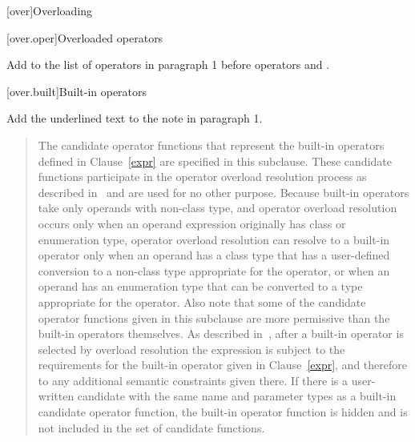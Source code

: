 
\setcounter{chapter}{12}
[over]{Overloading}

\setcounter{section}{3}
\setcounter{subsection}{1}
\setcounter{subsubsection}{1}
%

\setcounter{section}{4}
[over.oper]{Overloaded operators}

Add  to the list of operators in paragraph 1 before operators \tcode{()} and \tcode{[]}.

[over.built]{Built-in operators}%

Add the underlined text to the note in paragraph 1.

\begin{quote}
\pnum
The candidate operator functions that represent the built-in operators
defined in Clause~\ref{expr} are specified in this subclause.
These candidate
functions participate in the operator overload resolution process as
described in~ and are used for no other purpose.
\enternote
Because built-in operators take only operands with non-class type,
and operator overload resolution occurs only when an operand expression
originally has class or enumeration type,
operator overload resolution can resolve to a built-in operator only
when an operand has a class type that has a user-defined conversion to
a non-class type appropriate for the operator, or when an operand has
an enumeration type that can be converted to a type appropriate
for the operator.
Also note that some of the candidate operator functions given in this subclause are
more permissive than the built-in operators themselves.
As
described in~, after a built-in operator is selected
by overload resolution the expression is subject to the requirements for
the built-in operator given in Clause~\ref{expr}, and therefore to any
additional semantic constraints given there.
If there is a user-written
candidate with the same name and parameter types as a built-in
candidate operator function, the built-in operator function
is hidden and is not included in the set of candidate functions.
\exitnote
\end{quote}


